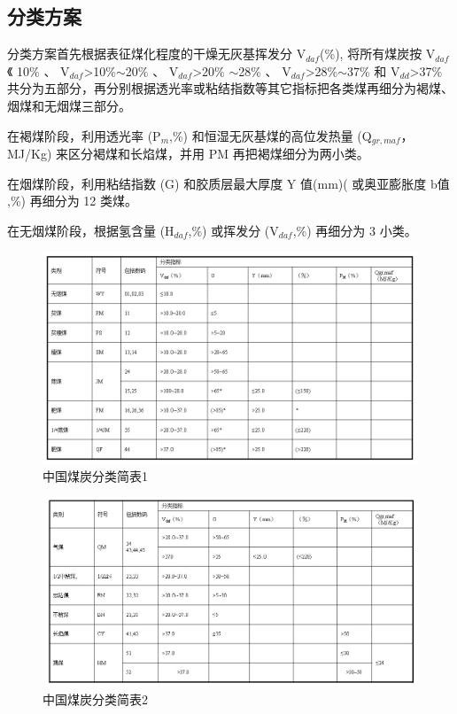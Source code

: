 \documentclass[10pt,openany]{ctexbook}
\begin{document}
\subsection{分类方案 }
分类方案首先根据表征煤化程度的干燥无灰基挥发分 V$_{daf}$(\%), 将所有煤炭按 V$_{daf}$ 《 10\% 、 V$_{daf}$>10\%$\sim$20\% 、  V$_{daf}$>20\% $\sim$28\% 、  V$_{daf}$>28\%$\sim$37\% 和  V$_{dd}$>37\% 共分为五部分，再分别根据透光率或粘结指数等其它指标把各类煤再细分为褐煤、烟煤和无烟煤三部分。     \par
在褐煤阶段，利用透光率 (P$_m$,\%) 和恒湿无灰基煤的高位发热量 (Q$_{gr,maf}$， MJ/Kg) 来区分褐煤和长焰煤，并用 PM 再把褐煤细分为两小类。\par
    在烟煤阶段，利用粘结指数 (G) 和胶质层最大厚度 Y 值(mm)( 或奥亚膨胀度 b值 ,\%) 再细分为 12 类煤。\par
    在无烟煤阶段，根据氢含量 (H$_{daf}$,\%) 或挥发分 (V$_{daf}$,\%) 再细分为 3 小类。\par
 \begin{figure}[!ht]
\includegraphics[scale=0.6]{5}
\caption{中国煤炭分类简表1}
\end{figure}
 \begin{figure}[!ht]
\includegraphics[scale=0.6]{6}
\caption{中国煤炭分类简表2}
\end{figure}
\end{document}
